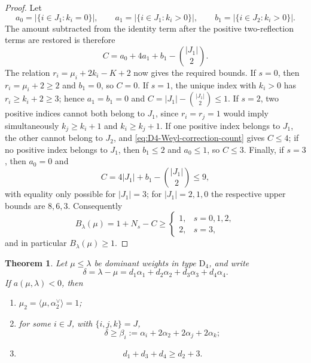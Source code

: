 \documentclass[11pt]{article}
\newtheorem{theorem}{Theorem}[section]
\theoremstyle{definition}
\theoremstyle{remark}
\newcommand{\typeD}{\ensuremath{\mathrm{D}}}
\begin{document}
\begin{proof}
Let
\[
 a_0=|\{i\in J_1:k_i=0\}|,
 \qquad a_1=|\{i\in J_1:k_i>0\}|,
 \qquad b_1=|\{i\in J_2:k_i>0\}|.
\]
The amount subtracted from the identity term after the positive two-reflection
terms are restored is therefore
\begin{equation}\label{eq:D4-Weyl-correction-count}
 C=a_0+4a_1+b_1-\binom{|J_1|}{2}.
\end{equation}
The relation $r_i=\mu_i+2k_i-K+2$ now gives the required bounds.  If $s=0$,
then $r_i=\mu_i+2\ge2$ and $b_1=0$, so $C=0$.  If $s=1$, the unique index
with $k_i>0$ has $r_i\ge k_i+2\ge3$; hence $a_1=b_1=0$ and
$C=|J_1|-\binom{|J_1|}{2}\le1$.  If $s=2$, two positive indices cannot both
belong to $J_1$, since $r_i=r_j=1$ would imply simultaneously
$k_j\ge k_i+1$ and $k_i\ge k_j+1$.  If one positive index belongs to $J_1$,
the other cannot belong to $J_2$, and \eqref{eq:D4-Weyl-correction-count}
gives $C\le4$; if no positive index belongs to $J_1$, then $b_1\le2$ and
$a_0\le1$, so $C\le3$.  Finally, if $s=3$, then $a_0=0$ and
\[
 C=4|J_1|+b_1-\binom{|J_1|}{2}\le9,
\]
with equality only possible for $|J_1|=3$; for $|J_1|=2,1,0$ the respective
upper bounds are $8,6,3$.  Consequently
\[
 B_\lambda(\mu)=1+N_s-C
 \ge\begin{cases}
 1,&s=0,1,2,\\
 2,&s=3,
 \end{cases}
\]
and in particular $B_\lambda(\mu)\ge1$.
\end{proof}

\begin{theorem}
\label{thm:D4-necessary}
Let $\mu\le\lambda$ be dominant weights in type $\typeD_4$, and write
\[
 \delta=\lambda-\mu
   =d_1\alpha_1+d_2\alpha_2+d_3\alpha_3+d_4\alpha_4.
\]
If $a(\mu,\lambda)<0$, then
\begin{enumerate}[label=\textnormal{(\roman*)}]
\item \label{item:D4-central}
$\mu_2=\langle\mu,\alpha_2^\vee\rangle=1$;
\item \label{item:D4-depth}
for some $i\in J$, with $\{i,j,k\}=J$,
\begin{equation}\label{eq:D4-depth}
 \delta\ge
 \beta_i:=\alpha_i+2\alpha_2+2\alpha_j+2\alpha_k;
\end{equation}
\item \label{item:D4-balance}
\begin{equation}\label{eq:D4-balance}
             d_1+d_3+d_4\ge d_2+3.
\end{equation}
\end{enumerate}
\end{theorem}
\end{document}
